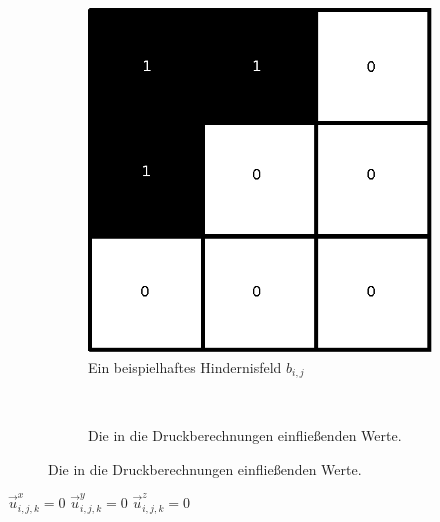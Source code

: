 \begin{figure}[ht]
	\begin{subfigure}[b]{0.5\textwidth}
		\centering
		\includegraphics[width=\textwidth]{images/boundary_field_for_pressure}
		\caption{Ein beispielhaftes Hindernisfeld $b_{i,j}$}
	\end{subfigure}
	~
	\begin{subfigure}[b]{0.5\textwidth}
		\centering
		\def\svgwidth{\textwidth}
		
		\caption{Die in die Druckberechnungen einfließenden Werte.}
	\label{fig:stam_modified_jacobi_algorithm}
	\end{subfigure}
\end{figure}

\begin{algorithm}
\caption{Die abschließende Randbedingungserzwingung}
\begin{algorithmic}
			\State $\vec{u}_{i,j,k}^x = 0$
		\EndIf
			\State $\vec{u}_{i,j,k}^y = 0$
		\EndIf
			\State $\vec{u}_{i,j,k}^z = 0$
		\EndIf
	\EndFor
\EndFunction
\end{algorithmic}
\label{alg:stam_enforce_free_slip}
\end{algorithm}
